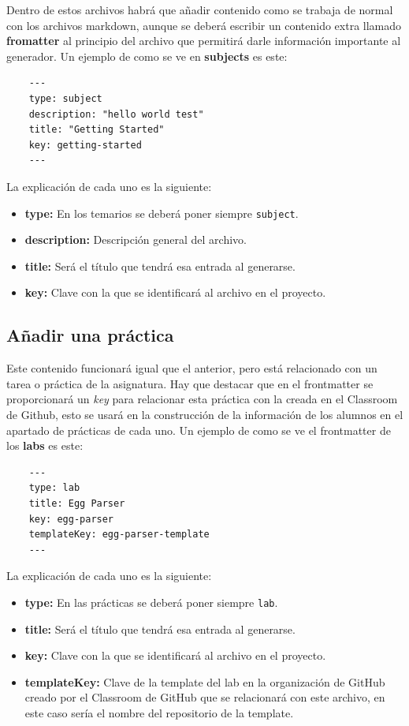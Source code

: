 Dentro de estos archivos habrá que añadir contenido como se trabaja de normal con los archivos markdown, aunque se deberá escribir un contenido extra llamado \textbf{fromatter} al principio del archivo que permitirá darle información importante al generador. Un ejemplo de como se ve en \textbf{subjects} es este:

\begin{verbatim}
    ---
    type: subject
    description: "hello world test"
    title: "Getting Started"
    key: getting-started
    ---
\end{verbatim}

La explicación de cada uno es la siguiente:

\begin{itemize}
    \item \textbf{type:} En los temarios se deberá poner siempre \verb|subject|.
    \item \textbf{description:} Descripción general del archivo.
    \item \textbf{title:} Será el título que tendrá esa entrada al generarse.
    \item \textbf{key:} Clave con la que se identificará al archivo en el proyecto.
\end{itemize}

\subsection{Añadir una práctica}

Este contenido funcionará igual que el anterior, pero está relacionado con un tarea o práctica de la asignatura. Hay que destacar que en el frontmatter se proporcionará un \textit{key} para relacionar esta práctica con la creada en el Classroom de Github, esto se usará en la construcción de la información de los alumnos en el apartado de prácticas de cada uno. Un ejemplo de como se ve el frontmatter de los \textbf{labs} es este:

\begin{verbatim}
    ---
    type: lab
    title: Egg Parser
    key: egg-parser
    templateKey: egg-parser-template
    ---
\end{verbatim}

La explicación de cada uno es la siguiente:

\begin{itemize}
    \item \textbf{type:} En las prácticas se deberá poner siempre \verb|lab|.
    \item \textbf{title:} Será el título que tendrá esa entrada al generarse.
    \item \textbf{key:} Clave con la que se identificará al archivo en el proyecto.
    \item \textbf{templateKey:} Clave de la template del lab en la organización de GitHub creado por el Classroom de GitHub que se relacionará con este archivo, en este caso sería el nombre del repositorio de la template.
\end{itemize}

